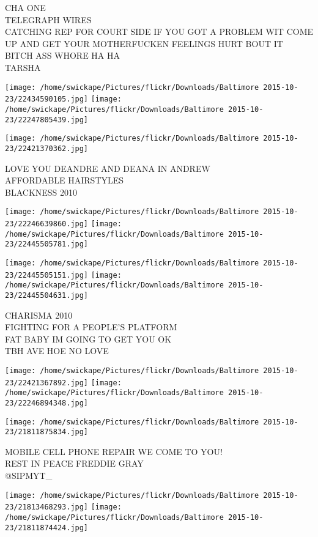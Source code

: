 \documentclass[10pt,letterpaper]{article}
\begin{document}
CHA ONE\\
TELEGRAPH WIRES\\
CATCHING REP FOR COURT SIDE IF YOU GOT A PROBLEM WIT COME UP AND GET YOUR MOTHERFUCKEN FEELINGS HURT BOUT IT BITCH ASS WHORE HA HA\\
TARSHA
\pagebreak

\texttt{[image: /home/swickape/Pictures/flickr/Downloads/Baltimore 2015-10-23/22434590105.jpg]}
\texttt{[image: /home/swickape/Pictures/flickr/Downloads/Baltimore 2015-10-23/22247805439.jpg]}

\vspace{0.25in}
\texttt{[image: /home/swickape/Pictures/flickr/Downloads/Baltimore 2015-10-23/22421370362.jpg]}

LOVE YOU DEANDRE AND DEANA IN ANDREW\\
AFFORDABLE HAIRSTYLES\\
BLACKNESS 2010
\pagebreak

\texttt{[image: /home/swickape/Pictures/flickr/Downloads/Baltimore 2015-10-23/22246639860.jpg]}
\texttt{[image: /home/swickape/Pictures/flickr/Downloads/Baltimore 2015-10-23/22445505781.jpg]}

\texttt{[image: /home/swickape/Pictures/flickr/Downloads/Baltimore 2015-10-23/22445505151.jpg]}
\texttt{[image: /home/swickape/Pictures/flickr/Downloads/Baltimore 2015-10-23/22445504631.jpg]}

CHARISMA 2010\\
FIGHTING FOR A PEOPLE'S PLATFORM\\
FAT BABY IM GOING TO GET YOU OK\\
TBH AVE HOE NO LOVE
\pagebreak

\texttt{[image: /home/swickape/Pictures/flickr/Downloads/Baltimore 2015-10-23/22421367892.jpg]}
\texttt{[image: /home/swickape/Pictures/flickr/Downloads/Baltimore 2015-10-23/22246894348.jpg]}

\vspace{0.25in}
\texttt{[image: /home/swickape/Pictures/flickr/Downloads/Baltimore 2015-10-23/21811875834.jpg]}

MOBILE CELL PHONE REPAIR WE COME TO YOU!\\
REST IN PEACE FREDDIE GRAY\\
@SIPMYT\_
\pagebreak

\texttt{[image: /home/swickape/Pictures/flickr/Downloads/Baltimore 2015-10-23/21813468293.jpg]}
\texttt{[image: /home/swickape/Pictures/flickr/Downloads/Baltimore 2015-10-23/21811874424.jpg]}
\end{document}
